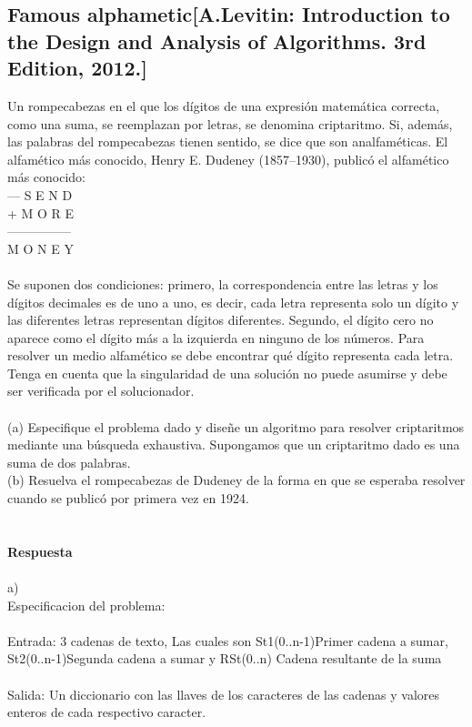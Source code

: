\documentclass[a4paper,12pt]{article}
\begin{document}
\subsection{Famous alphametic[A.Levitin: Introduction to the Design and Analysis of Algorithms. 3rd Edition, 2012.]}
Un rompecabezas en el que los dígitos de una expresión matemática correcta, como una suma, se reemplazan por letras, se denomina criptaritmo. Si, además, las palabras del rompecabezas tienen sentido, se dice que son analfaméticas. El alfamético más conocido, Henry E. Dudeney (1857–1930), publicó el alfamético más conocido:\\
--- S E N D\\
+ M O R E\\
---------------\\
M O N E Y\\\\
Se suponen dos condiciones: primero, la correspondencia entre las letras y los dígitos decimales es de uno a uno, es decir, cada letra representa solo un dígito y las diferentes letras representan dígitos diferentes. Segundo, el dígito cero no aparece como el dígito más a la izquierda en ninguno de los números. Para resolver un medio alfamético se debe encontrar qué dígito representa cada letra. Tenga en cuenta que la singularidad de una solución no puede asumirse y debe ser verificada por el solucionador.\\\\
(a) Especifique el problema dado y diseñe un algoritmo para resolver criptaritmos mediante una búsqueda exhaustiva. Supongamos que un criptaritmo dado es una suma de dos palabras.\\
(b) Resuelva el rompecabezas de Dudeney de la forma en que se esperaba resolver cuando se publicó por primera vez en 1924.\\\\\\
\textbf{Respuesta}\\\\
a)\\
Especificacion del problema:\\\\
Entrada: 3 cadenas de texto, Las cuales son St1(0..n-1)Primer cadena a sumar, St2(0..n-1)Segunda cadena a sumar y RSt(0..n) Cadena resultante de la suma\\\\
Salida: Un diccionario con las llaves de los caracteres de las cadenas y valores enteros de cada respectivo caracter.\\\\\\\\
\end{document}
